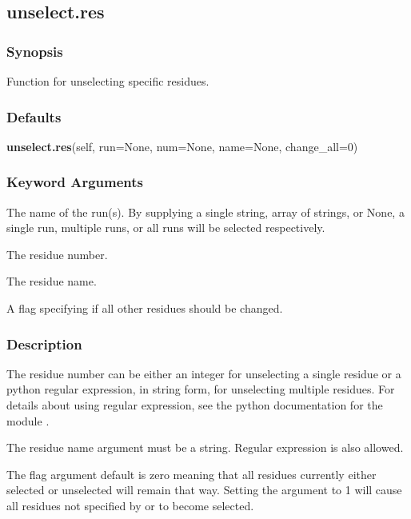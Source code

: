 


\newpage

\subsection{unselect.res}


\subsubsection{Synopsis}

Function for unselecting specific residues.

\subsubsection{Defaults}

\textsf{\textbf{unselect.res}(self, run=None, num=None, name=None, change\_all=0)}


\subsubsection{Keyword Arguments}


  The name of the run(s).  By supplying a single string, array of strings, or None, a single run, multiple runs, or all runs will be selected respectively.

  The residue number.

  The residue name.

  A flag specifying if all other residues should be changed.

\subsubsection{Description}

The residue number can be either an integer for unselecting a single residue or a python
regular expression, in string form, for unselecting multiple residues.  For details about
using regular expression, see the python documentation for the module 
.

The residue name argument must be a string.  Regular expression is also allowed.

The 
 flag argument default is zero meaning that all residues currently either
selected or unselected will remain that way.  Setting the argument to 1 will cause all
residues not specified by 
 or 
 to become selected.



